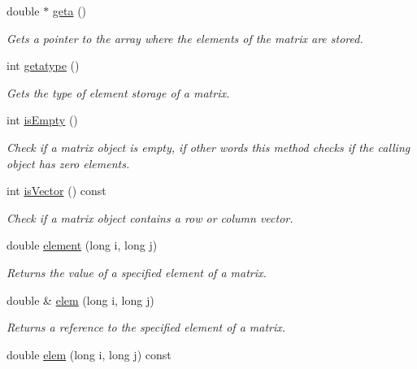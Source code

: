 \begin{DoxyCompactItemize}
double $\ast$ \hyperlink{classDMatrix_a48e4e74d3cd7affb6af7d1d0beaca129}{geta} ()
\begin{DoxyCompactList}\small\item\em Gets a pointer to the array where the elements of the matrix are stored. \item\end{DoxyCompactList}\item 
int \hyperlink{classDMatrix_a34b0f1e03bfc35e7e6ac298d21ca78c7}{getatype} ()
\begin{DoxyCompactList}\small\item\em Gets the type of element storage of a matrix. \item\end{DoxyCompactList}\item 
int \hyperlink{classDMatrix_a5616c72557eae51c38af63f6684391d0}{isEmpty} ()
\begin{DoxyCompactList}\small\item\em Check if a matrix object is empty, if other words this method checks if the calling object has zero elements. \item\end{DoxyCompactList}\item 
int \hyperlink{classDMatrix_a05a0f57ed7ed6cc3d57d9294d48ee4cc}{isVector} () const 
\begin{DoxyCompactList}\small\item\em Check if a matrix object contains a row or column vector. \item\end{DoxyCompactList}\item 
double \hyperlink{classDMatrix_a874f1e4a2796127f8efc9dedfe901603}{element} (long i, long j)
\begin{DoxyCompactList}\small\item\em Returns the value of a specified element of a matrix. \item\end{DoxyCompactList}\item 
double \& \hyperlink{classDMatrix_afbeef8ed62a91eef48e8664f6a9accd0}{elem} (long i, long j)
\begin{DoxyCompactList}\small\item\em Returns a reference to the specified element of a matrix. \item\end{DoxyCompactList}\item 
double \hyperlink{classDMatrix_ad07f4bea1e8e45647eb1514c1cb745be}{elem} (long i, long j) const 

\end{DoxyCompactItemize}
